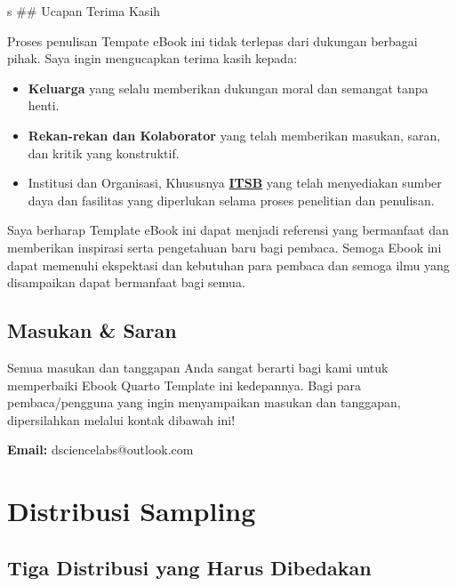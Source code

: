 \documentclass[
  indonesian,
  letterpaper,
]{book}
\providecommand{\tightlist}{%
  \setlength{\itemsep}{0pt}\setlength{\parskip}{0pt}}
\begin{document}
s \#\# Ucapan Terima Kasih

Proses penulisan Tempate eBook ini tidak terlepas dari dukungan berbagai
pihak. Saya ingin mengucapkan terima kasih kepada:

\begin{itemize}
\tightlist
\item
  \textbf{Keluarga} yang selalu memberikan dukungan moral dan semangat
  tanpa henti.
\item
  \textbf{Rekan-rekan dan Kolaborator} yang telah memberikan masukan,
  saran, dan kritik yang konstruktif.
\item
  Institusi dan Organisasi, Khususnya
  \textbf{\href{https://itsb.ac.id/}{ITSB}} yang telah menyediakan
  sumber daya dan fasilitas yang diperlukan selama proses penelitian dan
  penulisan.
\end{itemize}

Saya berharap Template eBook ini dapat menjadi referensi yang bermanfaat
dan memberikan inspirasi serta pengetahuan baru bagi pembaca. Semoga
Ebook ini dapat memenuhi ekspektasi dan kebutuhan para pembaca dan
semoga ilmu yang disampaikan dapat bermanfaat bagi semua.

\section*{Masukan \& Saran}\label{masukan-saran}


Semua masukan dan tanggapan Anda sangat berarti bagi kami untuk
memperbaiki Ebook Quarto Template ini kedepannya. Bagi para
pembaca/pengguna yang ingin menyampaikan masukan dan tanggapan,
dipersilahkan melalui kontak dibawah ini!

\textbf{Email:} dsciencelabs@outlook.com


\chapter{Distribusi Sampling}\label{distribusi-sampling}

\section{Tiga Distribusi yang Harus
Dibedakan}\label{tiga-distribusi-yang-harus-dibedakan}
\end{document}
